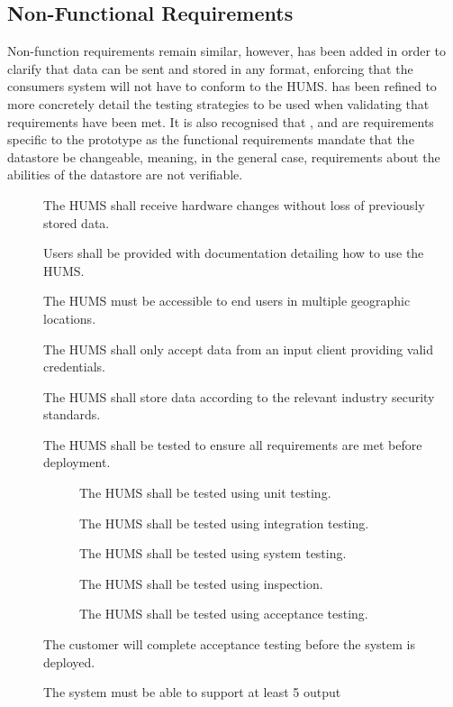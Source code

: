 \subsection{Non-Functional Requirements}
Non-function requirements remain similar, however,  has been 
added in order to clarify that data can be sent and stored in any format, 
enforcing that the consumers system will not have to conform to the HUMS. 
 has been refined to more concretely detail the testing strategies to 
be used when validating that requirements have been met.
It is also recognised that ,  and  are requirements 
specific to the prototype as the functional requirements mandate that the 
datastore be changeable, meaning, in the general case, requirements 
about the abilities of the datastore are not verifiable.
\begin{description}
	\item[] The HUMS shall receive hardware changes without loss 
	of previously stored data.
	\item[]  Users shall be provided with documentation detailing 
	how 	to use the HUMS.
	\item[] The HUMS must be accessible to end users in multiple 	
	geographic locations.
	\item[]  The HUMS shall only accept data from an input client 	
	providing valid credentials. 
	\item[] The HUMS shall store data according to the relevant 	
	industry security standards. 
	\item[]  The HUMS shall be tested to ensure all requirements are 
	met before deployment.
	\begin{description}
	\item[]  The HUMS shall be tested using unit testing.
	\item[]  The HUMS shall be tested using integration testing.
	\item[]  The HUMS shall be tested using system testing.
	\item[]  The HUMS shall be tested using inspection.
	\item[]  The HUMS shall be tested using acceptance testing.
	\end{description}
	\item[] The customer will complete acceptance testing before the 
	system is deployed.
	\item[] The system must be able to support at least 5 output 

\end{description}
